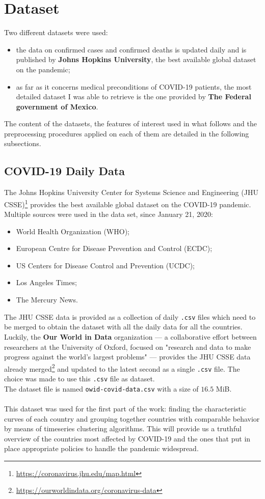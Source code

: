 \documentclass[11pt,a4paper]{article}
\begin{document}
\newpage
\section{Dataset}
Two different datasets were used:
\begin{itemize}
    \item the data on confirmed cases and confirmed deaths is updated daily and
    is published by \textbf{Johns Hopkins University}, the best available global
    dataset on the pandemic;
    \item as far as it concerns medical preconditions of COVID-19 patients,
    the most detailed dataset I was able to retrieve is the one provided by
    \textbf{The Federal government of Mexico}.
\end{itemize}
The content of the datasets, the features of interest used in what follows and
the preprocessing procedures applied on each of them are detailed in the
following subsections.
\subsection{COVID-19 Daily Data}
The Johns Hopkins University Center for Systems Science and Engineering
(JHU CSSE)\footnote{\url{https://coronavirus.jhu.edu/map.html}} provides the
best available global dataset on the COVID-19 pandemic. Multiple sources were
used in the data set, since January 21, 2020:
\begin{itemize}
    \item World Health Organization (WHO);
    \item European Centre for Disease Prevention and Control (ECDC);
    \item US Centers for Disease Control and Prevention (UCDC);
    \item Los Angeles Times;
    \item The Mercury News.
\end{itemize}
The JHU CSSE data is provided as a collection of daily \texttt{.csv} files which
need to be merged to obtain the dataset with all the daily data for all the
countries. Luckily, the \textbf{Our World in Data} organization --- a
collaborative effort between researchers at the University of Oxford, focused on
"research and data to make progress against the world's largest problems" ---
provides the JHU CSSE data already
merged\footnote{\url{https://ourworldindata.org/coronavirus-data}} and updated
to the latest second as a single \texttt{.csv} file. The choice was made to use
this \texttt{.csv} file as dataset.\\
The dataset file is named \texttt{owid-covid-data.csv} with a size of $16.5$
MiB.\\
\\
This dataset was used for the first part of the work: finding the characteristic
curves of each country and grouping together countries with comparable behavior
by means of timeseries clustering algorithms. This will provide us a truthful
overview of the countries most affected by COVID-19 and the ones that put in 
place appropriate policies to handle the pandemic widespread.
\end{document}
